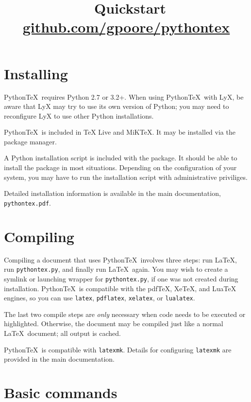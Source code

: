 \documentclass[twocolumn]{article}
\title{\vspace{-0.6in} \pytex\ Quickstart \\ {\normalsize \href{https://github.com/gpoore/pythontex}{github.com/gpoore/pythontex}}}
\author{}
\date{}
\newcommand{\pytex}{Python\TeX}
\begin{document}
\maketitle




\section*{Installing}

\pytex\ requires Python 2.7 or 3.2+.  When using \pytex\ with LyX, be aware that LyX may try to use its own version of Python; you may need to reconfigure LyX to use other Python installations.

\pytex\ is included in TeX Live and MiKTeX.  It may be installed via the package manager.

A Python installation script is included with the package.  It should be able to install the package in most situations.  Depending on the configuration of your system, you may have to run the installation script with administrative priviliges.

Detailed installation information is available in the main documentation, \texttt{pythontex.pdf}.

\section*{Compiling}

Compiling a document that uses \pytex\ involves three steps:  run \LaTeX, run \texttt{pythontex.py}, and finally run \LaTeX\ again.  You may wish to create a symlink or launching wrapper for \texttt{pythontex.py}, if one was not created during installation.  \pytex\ is compatible with the pdfTeX, XeTeX, and LuaTeX engines, so you can use \texttt{latex}, \texttt{pdflatex}, \texttt{xelatex}, or \texttt{lualatex}.

The last two compile steps are \emph{only} necessary when code needs to be executed or highlighted.  Otherwise, the document may be compiled just like a normal \LaTeX\ document; all output is cached.

\pytex\ is compatible with \texttt{latexmk}.  Details for configuring \texttt{latexmk} are provided in the main documentation.



\section*{Basic commands}
\end{document}
